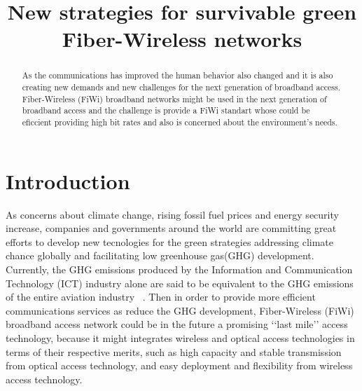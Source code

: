 \documentclass[conference,compsoc]{IEEEtran}
\begin{document}
\title{New strategies for survivable green Fiber-Wireless networks}

\author{
}

\maketitle


\begin{abstract}
As the communications has improved the human behavior also changed and it is also creating new demands and new challenges for the next generation of broadband access.
Fiber-Wireless (FiWi) broadband networks might be used in the next generation of broadband access and the challenge is provide a FiWi standart whose could be eficcient  providing high bit rates  and  also is concerned  about  the environment's needs.
\end{abstract}

\IEEEpeerreviewmaketitle

\section{Introduction}
As concerns about climate change, rising fossil fuel prices and energy security increase, companies and governments around the world are committing great efforts to develop new tecnologies for the green strategies addressing climate chance globally and facilitating low greenhouse gas(GHG) development. Currently, the GHG emissions produced by the Information and Communication Technology (ICT) industry alone are said to be equivalent to the GHG emissions of the entire aviation industry ~\cite{yu2012green}.
Then in order to provide more efficient communications services as reduce the GHG development, Fiber-Wireless (FiWi) broadband access network could be in the future a promising ‘‘last mile’’ access technology, because it might integrates wireless and optical access technologies in terms of their respective merits, such as high capacity and stable transmission from optical access technology, and easy deployment and flexibility from wireless access technology. 
\end{document}
